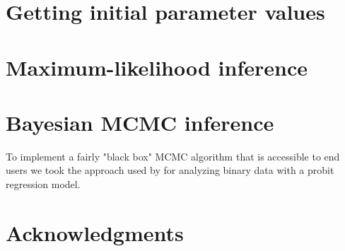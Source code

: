 \documentclass[12pt]{article}
\begin{document}
\section*{Getting initial parameter values}

\section*{Maximum-likelihood inference}

\section*{Bayesian MCMC inference}

To implement a fairly "black box" MCMC algorithm that is accessible to end users we took the approach used by \citet{ALBERT:1993fk} for analyzing binary data with a probit regression model.

\section*{Acknowledgments}



\end{document}
